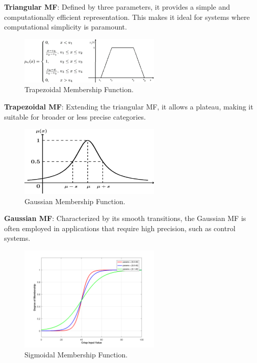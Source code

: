 \documentclass[a4paper,12pt]{report}
\begin{document}
\noindent \textbf{Triangular MF}: Defined by three parameters, it provides a simple and computationally efficient representation. This makes it ideal for systems where computational simplicity is paramount.

\begin{figure}[H]
    \centering
    \includegraphics[width=0.6\textwidth]{trapmf.png}
    \caption{Trapezoidal Membership Function.}
    \label{fig:trapezoidal}
\end{figure}

\noindent \textbf{Trapezoidal MF}: Extending the triangular MF, it allows a plateau, making it suitable for broader or less precise categories.

\begin{figure}[H]
    \centering
    \includegraphics[width=0.6\textwidth]{gaussmf.png}
    \caption{Gaussian Membership Function.}
    \label{fig:gaussian}
\end{figure}

\noindent \textbf{Gaussian MF}: Characterized by its smooth transitions, the Gaussian MF is often employed in applications that require high precision, such as control systems.

\begin{figure}[H]
    \centering
    \includegraphics[width=0.6\textwidth]{sigmf.png}
    \caption{Sigmoidal Membership Function.}
    \label{fig:sigmoidal}
\end{figure}
\end{document}
